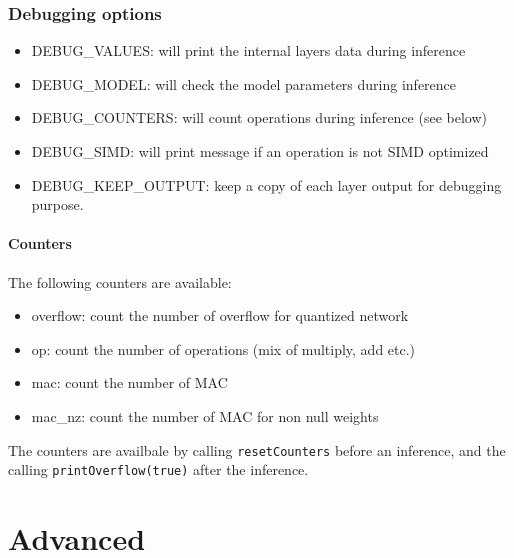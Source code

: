 \documentclass[10pt,a4paper]{article}
\begin{document}
\subsubsection{Debugging options}
\begin{itemize}
\item \textrm{DEBUG\_VALUES}: will print the internal layers data during inference
\item \textrm{DEBUG\_MODEL}: will check the model parameters during inference
\item \textrm{DEBUG\_COUNTERS}: will count operations during inference (see below)
\item \textrm{DEBUG\_SIMD}: will print message if an operation is not SIMD optimized
\item \textrm{DEBUG\_KEEP\_OUTPUT}: keep a copy of each layer output for debugging purpose.
\end{itemize}

\paragraph{Counters}
The following counters are available:
\begin{itemize}
\item overflow: count the number of overflow for quantized network
\item op: count the number of operations (mix of multiply, add etc.)
\item mac: count the number of MAC
\item mac\_nz: count the number of MAC for non null weights
\end{itemize}
The counters are availbale by calling \texttt{resetCounters} before an inference, and the calling \texttt{printOverflow(true)} after the inference.

\section{Advanced}
\end{document}
